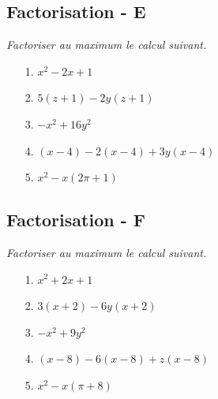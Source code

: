 \documentclass[paper=a4, fontsize=9pt]{scrartcl} %
\begin{document}
\begin{multicols}{2}

  \subsection*{Factorisation - E}
  \textit{Factoriser au maximum le calcul suivant.}

  \begin{enumerate}
  \item[1.] $x^2 -2x + 1$
  \item[2.] $5(z + 1) - 2y(z + 1)$
  \item[3.] $-x^2 + 16y^2$
  \item[4.] $(x - 4) - 2(x - 4) + 3y(x - 4)$
  \item[5.] $x^2 -  x(2\pi + 1)$
  \end{enumerate}

  \subsection*{Factorisation - F}
  \textit{Factoriser au maximum le calcul suivant.}

  \begin{enumerate}
  \item[1.] $x^2 +2x + 1$
  \item[2.] $3(x + 2) - 6y(x + 2)$
  \item[3.] $-x^2 + 9y^2$
  \item[4.] $(x - 8) - 6(x - 8) + z(x - 8)$
  \item[5.] $x^2 - x(\pi + 8)$
  \end{enumerate}

\end{multicols}

\vspace{1cm}
\end{document}
